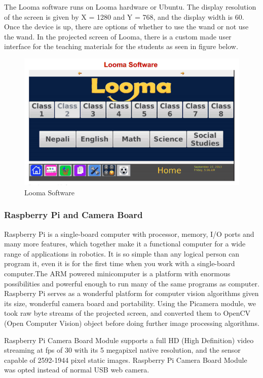 \documentclass[12pt, a4paper]{article}
\begin{document}
The Looma software runs on Looma hardware or Ubuntu. The display resolution of the screen is given by X = 1280 and Y = 768, and the display width is 60. Once the device is up, there are options of whether to use the wand or not use the wand. In the projected screen of Looma, there is a custom made user interface for the teaching materials for the students as seen in figure below.

\begin{figure}[htp]
	\centering
		\includegraphics[scale=0.3]{loomasoftware.png}
	\caption{Looma Software}
\label{}
\end{figure}

\subsubsection{Raspberry Pi and Camera Board}
Raspberry Pi is a single-board computer with processor, memory, I/O ports and many more features, which together make it a functional computer for a wide range of applications in robotics. It is so simple than any logical person can program it, even it is for the first time when you work with a single-board computer.The ARM powered minicomputer is a platform with enormous possibilities and powerful enough to run many of the same programs as computer. Raspberry Pi serves as a wonderful platform for computer vision algorithms given its size, wonderful camera board and portability. Using the Picamera module, we took raw byte streams of the projected screen, and converted them to OpenCV (Open Computer Vision) object before doing further image processing algorithms.

Raspberry Pi Camera Board Module supports a full HD (High Definition) video streaming at fps of 30 with its 5 megapixel native resolution, and the sensor capable of 2592-1944 pixel static images. Raspberry Pi Camera Board Module was opted instead of normal USB web camera. 
\end{document}
